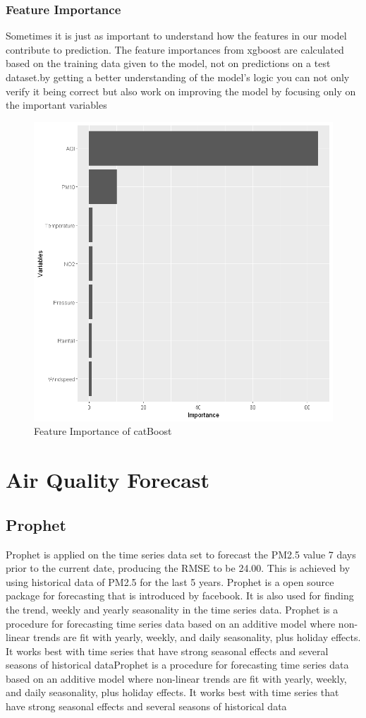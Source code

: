  \subsubsection{Feature Importance}
 Sometimes it
is just as important to understand how the features
in our model contribute to prediction. The feature
importances from xgboost are	
calculated based on the training data given to the
model, not on predictions on a test dataset.by
getting a better understanding of the model’s
logic you can not only verify it being correct but
also work on improving the model by focusing
only on the important variables
\begin{figure}[h]
\label{bd}
\centering
\includegraphics[width= 8 cm]{catimp.png}
\caption{Feature Importance of catBoost}
\end{figure}
\pagebreak
\section{Air Quality Forecast}

\subsection{Prophet}
Prophet is applied on the time series data set to
forecast the PM2.5 value 7 days prior to the
current date, producing the RMSE to be 24.00.
This is achieved by using historical data of PM2.5
for the last 5 years.
Prophet is a open source package for forecasting that is introduced by facebook. It is also used for finding the trend, weekly and yearly seasonality in the time series data.
Prophet is a procedure for forecasting time series
data based on an additive model where non-linear
trends are fit with yearly, weekly, and daily
seasonality, plus holiday effects. It works best
with time series that have strong seasonal effects
and several seasons of historical dataProphet is a procedure for forecasting time series
data based on an additive model where non-linear
trends are fit with yearly, weekly, and daily
seasonality, plus holiday effects. It works best
with time series that have strong seasonal effects
and several seasons of historical data

